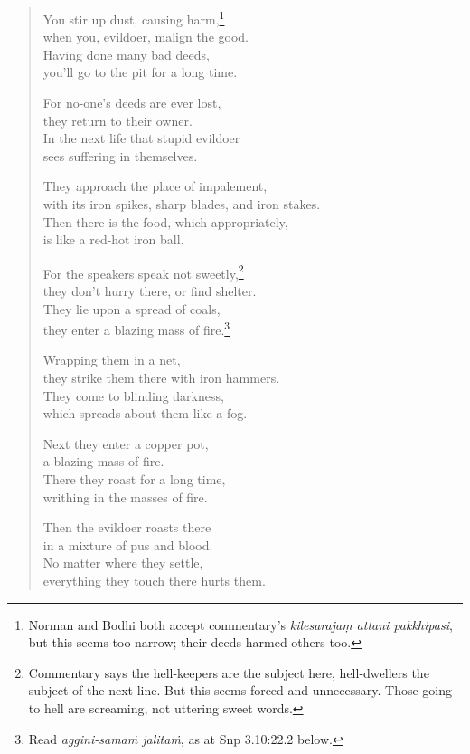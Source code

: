 \documentclass[12pt,openany]{book}%
\begin{document}
\begin{verse}
You stir up dust, causing harm,\footnote{Norman and Bodhi both accept commentary’s \textit{kilesarajaṃ attani pakkhipasi}, but this seems too narrow; their deeds harmed others too. } \\
when you, evildoer, malign the good. \\
Having done many bad deeds, \\
you’ll go to the pit for a long time. 

For no-one’s deeds are ever lost, \\
they return to their owner. \\
In the next life that stupid evildoer \\
sees suffering in themselves. 

They approach the place of impalement, \\
with its iron spikes, sharp blades, and iron stakes. \\
Then there is the food, which appropriately, \\
is like a red-hot iron ball. 

For the speakers speak not sweetly,\footnote{Commentary says the hell-keepers are the subject here, hell-dwellers the subject of the next line. But this seems forced and unnecessary. Those going to hell are screaming, not uttering sweet words. } \\
they don’t hurry there, or find shelter. \\
They lie upon a spread of coals, \\
they enter a blazing mass of fire.\footnote{Read \textit{aggini-\textsanskrit{samaṁ} \textsanskrit{jalitaṁ}}, as at Snp 3.10:22.2 below. } 

Wrapping them in a net, \\
they strike them there with iron hammers. \\
They come to blinding darkness, \\
which spreads about them like a fog. 

Next they enter a copper pot, \\
a blazing mass of fire. \\
There they roast for a long time, \\
writhing in the masses of fire. 

Then the evildoer roasts there \\
in a mixture of pus and blood. \\
No matter where they settle, \\
everything they touch there hurts them. 


\end{verse}
\end{document}
